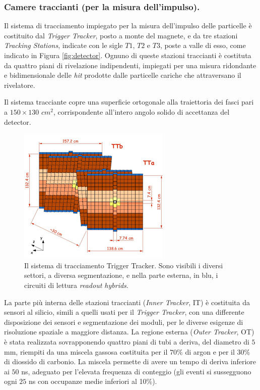\subsubsection{Camere traccianti (per la misura dell'impulso).}
\noindent
Il sistema di tracciamento impiegato per la misura dell'impulso delle particelle \`e costituito dal \emph{Trigger Tracker}, posto a monte del magnete, e da tre stazioni \emph{Tracking Stations}, indicate con le sigle $T1$, $T2$ e $T3$, poste a valle di esso, come indicato in Figura \ref{fig:detector}. Ognuno di queste stazioni traccianti \`e costituta da quattro piani di rivelazione indipendenti, impiegati per una misura ridondante e bidimensionale delle \emph{hit } prodotte dalle particelle cariche che attraversano il rivelatore. 

Il sistema tracciante copre una superficie ortogonale alla traiettoria dei fasci pari a $150 × 130$ $cm^2$, corrispondente all'intero angolo solido di accettanza del detector.
\begin{figure}
\centering
\includegraphics[scale=0.9]{Immagini/TriggerTracker}
\caption{Il sistema di tracciamento Trigger Tracker. Sono visibili i diversi settori, a diversa segmentazione, e nella parte esterna, in blu, 
i circuiti di lettura \emph{readout hybrids}.}
\label{fig:TriggerTracker}
\end{figure}
La parte pi\`u interna delle stazioni traccianti (\emph{Inner Tracker}, IT) \`e costituita da sensori al silicio, simili a quelli usati per il \emph{Trigger Tracker}, con una
differente disposizione dei sensori e segmentazione dei moduli, per le diverse esigenze di risoluzione spaziale a maggiore distanza. 
La regione esterna (\emph{Outer Tracker}, OT) \`e stata realizzata sovrapponendo quattro piani di tubi a deriva, del diametro di $5$ mm, riempiti da una miscela gassosa costituita per il $70\%$ di argon e per il $30\%$ di diossido di carbonio. La miscela permette di avere un tempo di deriva inferiore ai $50$ ns, adeguato per l'elevata frequenza di conteggio  (gli eventi si sussegguono ogni $25$ ns con occupanze medie inferiori al 10\%).
%
%
